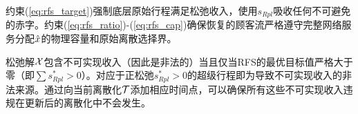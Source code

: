 约束(\ref{eq:rfs_target})强制底层原始行程满足松弛收入，使用$s_{Rpl}$吸收任何不可避免的赤字。约束(\ref{eq:rfs_ratio})-(\ref{eq:rfs_cap})确保恢复的顾客流严格遵守完整网络服务分配$\hat{x}$的物理容量和原始离散选择界。

松弛解$\mathcal{X}$包含不可实现收入（因此是非法的）当且仅当RFS的最优目标值严格大于零（即$\sum s_{Rpl}^* > 0$）。对应于正松弛$s_{Rpl}^* > 0$的超级行程即为导致不可实现收入的非法来源。通过向当前离散化$\mathcal{T}$添加相应时间点，可以确保所有这些不可实现收入违规在更新后的离散化中不会发生。
